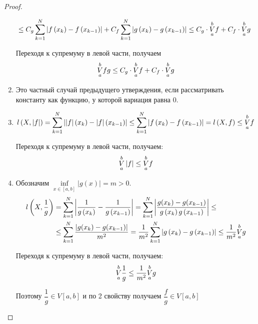 \documentclass[../main.tex]{subfiles}
\begin{document}
\begin{proof}
\begin{enumerate}
\begin{equation*}
\begin{aligned}
                & \leq C_g \sum\limits_{ k=1}^{ N} \left| f\left( x_k\right)-f \left( x_{k-1}\right)\right| + C_f \sum\limits_{ k=1}^{ N} \left| g \left( x_k\right)-g \left( x_{k-1}\right)\right| \leq C_g \cdot \underset{ a}{\overset{ b}{V}} f + C_f \cdot \underset{ a}{\overset{ b}{V}} g
            \end{aligned}
        \end{equation*}
        \par Переходя к супремуму в левой части, получаем 
        \[ \underset{ a}{\overset{ b}{V}}fg \leq C_g \cdot \underset{ a}{\overset{ b}{V}} f +C_f \cdot \underset{ a}{\overset{ b}{V}} g\]
        \item Это частный случай предыдущего утверждения, если рассматривать константу как функцию, у которой вариация равна 0. 
        \item 
        \begin{equation*}
            \begin{aligned}
                l \left( X, \left| f\right|\right)= \sum\limits_{ k=1}^{ N} \left| \left| f\right|\left( x_k\right)- \left| f\right|\left( x_{k-1}\right)\right| \leq \sum\limits_{ k=1}^{ N} \left| f \left( x_k\right)-f \left( x_{k-1}\right)\right|=l \left( X,f\right) \leq \underset{ a}{\overset{ b}{V}} f
            \end{aligned}
        \end{equation*}
        \par Переходя к супремуму в левой части, получаем: 
        \[ \underset{ a}{\overset{ b}{V}} \left| f\right| \leq \underset{ a}{\overset{ b}{V}} f\]
        \item Обозначим \( \inf\limits_{x \in \left[ a,b\right]} \left| g \left( x\right)\right|=m >0\).
        \begin{equation*}
            \begin{aligned}
                l \left( X, \dfrac{ 1}{ g} \right)&= \sum\limits_{ k=1}^{ N} \left| \dfrac{ 1}{ g \left( x_k\right)}- \dfrac{ 1}{ g \left( x_{k-1}\right)}  \right|= \sum\limits_{ k=1}^{ N} \left| \dfrac{ g(x_k)-g(x_{k-1})}{ g \left( x_k\right)g \left( x_{k-1}\right)} \right| \leq \\
                & \leq \sum\limits_{ k=1}^{ N} \dfrac{ \left|g(x_k)-g(x_{k-1})\right|}{ m^2} = \dfrac{ 1}{ m^2} \sum\limits_{ k=1}^{ N} \left| g \left( x_k\right) - g \left( x_{k-1}\right)\right| \leq \dfrac{ 1}{ m^2} \underset{ a}{\overset{ b}{V}} g
            \end{aligned}
        \end{equation*} 
        \par Переходя к супремуму в левой части, получаем: 
        \[ \underset{ a}{\overset{ b}{V}} \dfrac{ 1}{ g} \leq \dfrac{ 1}{ m^2} \underset{ a}{\overset{ b}{V}} g\]
        \par Поэтому \( \dfrac{ 1}{ g} \in V\left[ a,b\right]\) и по 2 свойству получаем \( \dfrac{ f}{ g} \in V\left[ a,b\right]\) 
    \end{enumerate}
\end{proof}
\end{document}
